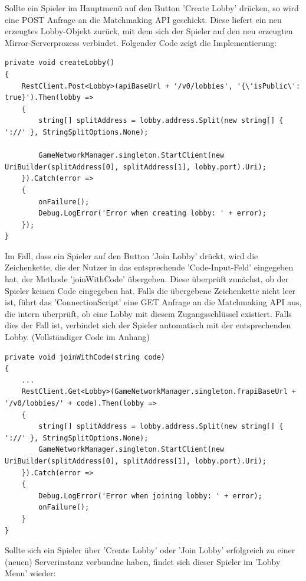 Sollte ein Spieler im Hauptmenü auf den Button 'Create Lobby' drücken, so wird eine POST Anfrage an die Matchmaking API geschickt. Diese liefert ein neu erzeugtes Lobby-Objekt zurück, mit dem sich der Spieler auf den neu erzeugten Mirror-Serverprozess verbindet. Folgender Code zeigt die Implementierung:

\newpage

\begin{lstlisting}[caption= ConnectionScript.cs createLobby()]
private void createLobby()
{
	RestClient.Post<Lobby>(apiBaseUrl + '/v0/lobbies', '{\'isPublic\': true}').Then(lobby =>
	{
		string[] splitAddress = lobby.address.Split(new string[] { '://' }, StringSplitOptions.None);
		
		GameNetworkManager.singleton.StartClient(new UriBuilder(splitAddress[0], splitAddress[1], lobby.port).Uri);
	}).Catch(error =>
	{
		onFailure();
		Debug.LogError('Error when creating lobby: ' + error);
	});
}	
\end{lstlisting}

Im Fall, dass ein Spieler auf den Button 'Join Lobby' drückt, wird die Zeichenkette, die der Nutzer in das entsprechende 'Code-Input-Feld' eingegeben hat, der Methode 'joinWithCode' übergeben. Diese überprüft zunächst, ob der Spieler keinen Code eingegeben hat. Falls die übergebene Zeichenkette nicht leer ist, führt das 'ConnectionScript' eine GET Anfrage an die Matchmaking API aus, die intern überprüft, ob eine Lobby mit diesem Zugangsschlüssel existiert. Falls dies der Fall ist, verbindet sich der Spieler automatisch mit der entsprechenden Lobby. (Vollständiger Code im Anhang)

\begin{lstlisting}[caption= ConnectionScript.cs joinWithCode()]
private void joinWithCode(string code)
{
	...		
	RestClient.Get<Lobby>(GameNetworkManager.singleton.frapiBaseUrl + '/v0/lobbies/' + code).Then(lobby =>
	{
		string[] splitAddress = lobby.address.Split(new string[] { '://' }, StringSplitOptions.None);
		GameNetworkManager.singleton.StartClient(new UriBuilder(splitAddress[0], splitAddress[1], lobby.port).Uri);
	}).Catch(error =>
	{
		Debug.LogError('Error when joining lobby: ' + error);
		onFailure();
	}
}
\end{lstlisting}

Sollte sich ein Spieler über 'Create Lobby' oder 'Join Lobby' erfolgreich zu einer (neuen) Serverinstanz verbundne haben, findet sich dieser Spieler im 'Lobby Menu' wieder:

